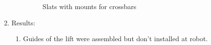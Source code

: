 \begin{enumerate}
\begin{enumerate}
\begin{figure}[H]
\begin{minipage}[h]{0.47\linewidth}
      	\end{minipage}
      	\caption{Slats with mounts for crossbars}
      \end{figure}
      
    \end{enumerate}
    
	\item Results: 
	\begin{enumerate}
	  \item Guides of the lift were assembled but don't installed at robot.


\end{enumerate}
\end{enumerate}
